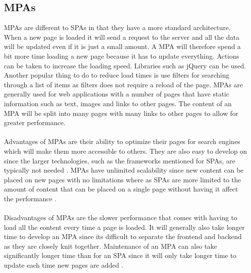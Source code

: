 \subsection{MPAs}
MPAs are different to SPAs in that they have a more standard architecture.
When a new page is loaded it will send a request to the server and all the data will be updated even if it is just a small amount.
A MPA will therefore spend a bit more time loading a new page because it has to update everything.
Actions can be taken to increase the loading speed. 
Libraries such as jQuery can be used.
Another popular thing to do to reduce load times is use filters for searching through a list of items as filters does not require a reload of the page.
MPAs are generally used for web applications with a number of pages that have static information such as text, images and links to other pages. The content of an MPA will be split into many pages with many links to other pages to allow for greater performance.
\\\\
Advantages of MPAs are their ability to optimize their pages for search engines which will make them more accessible to others. 
They are also easy to develop on since the larger technologies, such as the frameworks mentioned for SPAs, are typically not needed \cite{SPAvsMPAMerehead}.
MPAs have unlimited scalability since new content can be placed on new pages with no limitations where as SPAs are more limited to the amount of content that can be placed on a single page without having it affect the performance \cite{SPAvsMPARuby}.
\\\\
Disadvantages of MPAs are the slower performance that comes with having to load all the content every time a page is loaded.
It will generally also take longer time to develop an MPA since its difficult to separate the frontend and backend as they are closely knit together.
Maintenance of an MPA can also take significantly longer time than for an SPA since it will only take longer time to update each time new pages are added \cite{SPAvsMPARuby}. 

